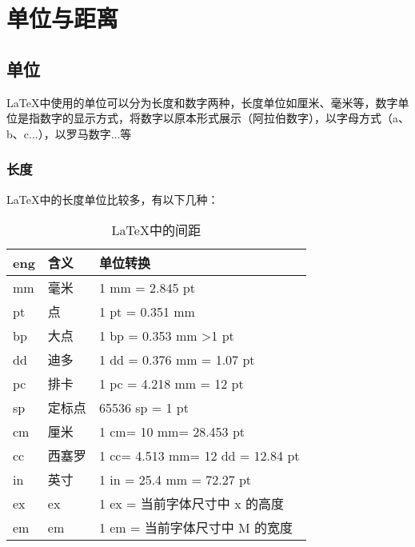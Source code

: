 
\section{单位与距离}\label{sec:大小与间距}

\subsection{单位}
\LaTeX{}中使用的单位可以分为长度和数字两种，长度单位如厘米、毫米等，数字单位是指数字的显示方式，将数字以原本形式展示（阿拉伯数字），以字母方式（a、b、c...），以罗马数字...等
\subsubsection{长度}
\LaTeX{}中的长度单位比较多，有以下几种：
\begin{center}
    \setlength\tablewidth{\dimexpr (\textwidth -6\tabcolsep)}
    \begin{table}[H]
        \begin{tabular}{|p{0.19\tablewidth}<{\centering}|p{0.19\tablewidth}<{\centering}|p{0.62\tablewidth}<{\centering}|}
            \hline
            eng&含义&单位转换\\
            \hline
            mm&毫米&1 mm = 2.845 pt\\
            \hline
            pt&点&1 pt = 0.351 mm\\
            \hline
            bp&大点&1 bp = 0.353 mm >1 pt\\
            \hline
            dd&迪多&1 dd = 0.376 mm = 1.07 pt\\
            \hline
            pc&排卡&1 pc = 4.218 mm = 12 pt\\
            \hline
            sp&定标点&65536 sp = 1 pt\\
            \hline
            cm&厘米&1 cm= 10 mm= 28.453 pt\\
            \hline
            cc&西塞罗&1 cc= 4.513 mm= 12 dd = 12.84 pt\\
            \hline
            in&英寸&1 in = 25.4 mm = 72.27 pt\\
            \hline
            ex&ex&1 ex = 当前字体尺寸中 x 的高度\\
            \hline
            em&em&1 em = 当前字体尺寸中 M 的宽度\\
            \hline
        \end{tabular}
        \caption{\LaTeX{}中的间距}
        \label{tag:latex-distance}
    \end{table}
\end{center}

